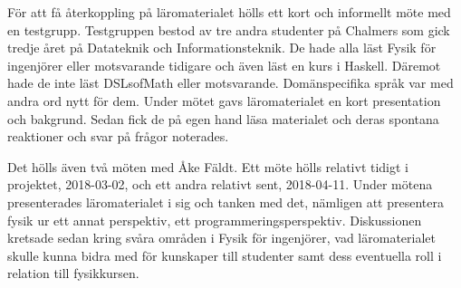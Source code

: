 För att få återkoppling på läromaterialet hölls ett kort och informellt möte med
en testgrupp. Testgruppen bestod av tre andra studenter på Chalmers som gick
tredje året på Datateknik och Informationsteknik. De hade alla läst Fysik för
ingenjörer eller motsvarande tidigare och även läst en kurs i Haskell.
Däremot hade de inte läst DSLsofMath eller motsvarande. Domänspecifika språk var
med andra ord nytt för dem. Under mötet gavs läromaterialet en kort presentation och bakgrund. Sedan fick de på egen hand läsa materialet och deras
spontana reaktioner och svar på frågor noterades.

Det hölls även två möten med Åke Fäldt. Ett möte hölls relativt
tidigt i projektet, 2018-03-02, och ett andra relativt sent, 2018-04-11.
Under mötena presenterades läromaterialet i sig och tanken med det, nämligen att
presentera fysik ur ett annat perspektiv, ett
programmeringsperspektiv. Diskussionen kretsade sedan kring svåra områden i Fysik för
ingenjörer, vad läromaterialet skulle kunna
bidra med för kunskaper till studenter samt dess eventuella roll i relation till
fysikkursen.
